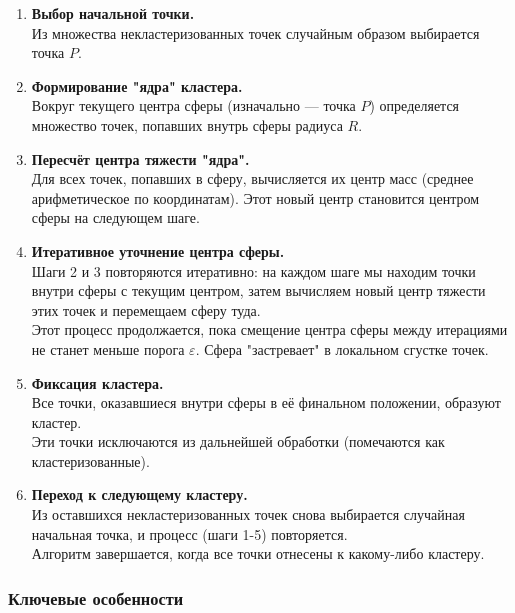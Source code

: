 \documentclass[11pt]{article}
\begin{document}
\begin{enumerate}
    \item \textbf{Выбор начальной точки.} \\
    Из множества некластеризованных точек случайным образом выбирается точка $P$.
    
    \item \textbf{Формирование "ядра" кластера.} \\
    Вокруг текущего центра сферы (изначально — точка $P$) определяется множество точек, попавших внутрь сферы радиуса $R$.
    
    \item \textbf{Пересчёт центра тяжести "ядра".} \\
    Для всех точек, попавших в сферу, вычисляется их центр масс (среднее арифметическое по координатам). Этот новый центр становится центром сферы на следующем шаге.
    
    \item \textbf{Итеративное уточнение центра сферы.} \\
    Шаги 2 и 3 повторяются итеративно: на каждом шаге мы находим точки внутри сферы с текущим центром, затем вычисляем новый центр тяжести этих точек и перемещаем сферу туда. \\
    Этот процесс продолжается, пока смещение центра сферы между итерациями не станет меньше порога $\varepsilon$. Сфера "застревает" в локальном сгустке точек.
    
    \item \textbf{Фиксация кластера.} \\
    Все точки, оказавшиеся внутри сферы в её финальном положении, образуют кластер. \\
    Эти точки исключаются из дальнейшей обработки (помечаются как кластеризованные).
    
    \item \textbf{Переход к следующему кластеру.} \\
    Из оставшихся некластеризованных точек снова выбирается случайная начальная точка, и процесс (шаги 1-5) повторяется. \\
    Алгоритм завершается, когда все точки отнесены к какому-либо кластеру.
\end{enumerate}

\subsubsection{Ключевые особенности}
\end{document}

